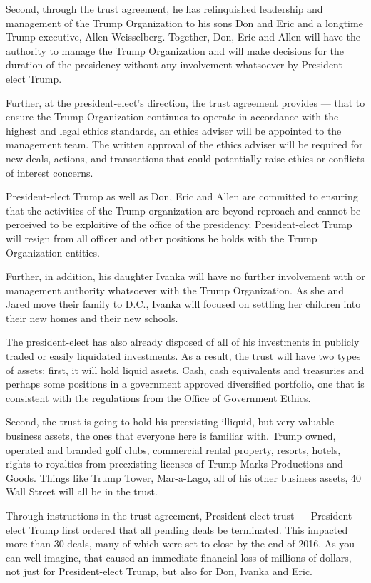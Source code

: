 Second, through the trust agreement, he has relinquished leadership and
management of the Trump Organization to his sons Don and Eric and a
longtime Trump executive, Allen Weisselberg. Together, Don, Eric and
Allen will have the authority to manage the Trump Organization and will
make decisions for the duration of the presidency without any
involvement whatsoever by President-elect Trump.

Further, at the president-elect's direction, the trust agreement
provides --- that to ensure the Trump Organization continues to operate
in accordance with the highest and legal ethics standards, an ethics
adviser will be appointed to the management team. The written approval
of the ethics adviser will be required for new deals, actions, and
transactions that could potentially raise ethics or conflicts of
interest concerns.

President-elect Trump as well as Don, Eric and Allen are committed to
ensuring that the activities of the Trump organization are beyond
reproach and cannot be perceived to be exploitive of the office of the
presidency. President-elect Trump will resign from all officer and other
positions he holds with the Trump Organization entities.

Further, in addition, his daughter Ivanka will have no further
involvement with or management authority whatsoever with the Trump
Organization. As she and Jared move their family to D.C., Ivanka will
focused on settling her children into their new homes and their new
schools.

The president-elect has also already disposed of all of his investments
in publicly traded or easily liquidated investments. As a result, the
trust will have two types of assets; first, it will hold liquid assets.
Cash, cash equivalents and treasuries and perhaps some positions in a
government approved diversified portfolio, one that is consistent with
the regulations from the Office of Government Ethics.

Second, the trust is going to hold his preexisting illiquid, but very
valuable business assets, the ones that everyone here is familiar with.
Trump owned, operated and branded golf clubs, commercial rental
property, resorts, hotels, rights to royalties from preexisting licenses
of Trump-Marks Productions and Goods. Things like Trump Tower,
Mar-a-Lago, all of his other business assets, 40 Wall Street will all be
in the trust.

Through instructions in the trust agreement, President-elect trust ---
President-elect Trump first ordered that all pending deals be
terminated. This impacted more than 30 deals, many of which were set to
close by the end of 2016. As you can well imagine, that caused an
immediate financial loss of millions of dollars, not just for
President-elect Trump, but also for Don, Ivanka and Eric.

